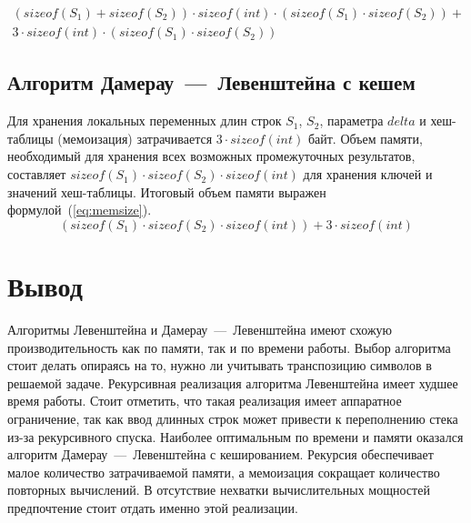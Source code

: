 \begin{equation}
\begin{split}
\label{eq:recL}
    (sizeof(S_1) + sizeof(S_2)) \cdot sizeof(int) \cdot (sizeof(S_1) \cdot sizeof(S_2)) + \\
    3 \cdot sizeof(int) \cdot (sizeof(S_1) \cdot sizeof(S_2))
\end{split}
\end{equation}

\subsection{Алгоритм Дамерау~---~Левенштейна с кешем}

Для хранения локальных переменных длин строк $S_1$, $S_2$, параметра $delta$ и хеш-таблицы (мемоизация) затрачивается $3 \cdot sizeof(int)$ байт. Объем памяти, необходимый для хранения всех возможных промежуточных результатов, составляет $sizeof(S_1) \cdot sizeof(S_2) \cdot sizeof(int)$ для хранения ключей и значений хеш-таблицы. Итоговый объем памяти выражен формулой~(\ref{eq:memsize}).
\begin{equation}
    \label{eq:memsize}
    (sizeof(S_1) \cdot sizeof(S_2) \cdot sizeof(int)) + 3 \cdot sizeof(int)
\end{equation}

\clearpage

\section*{Вывод}

Алгоритмы Левенштейна и Дамерау~---~Левенштейна имеют схожую производительность как по памяти, так и по времени работы. Выбор алгоритма стоит делать опираясь на то, нужно ли учитывать транспозицию символов в решаемой задаче. Рекурсивная реализация алгоритма Левенштейна имеет худшее время работы. Стоит отметить, что такая реализация имеет аппаратное ограничение, так как ввод длинных строк может привести к переполнению стека из-за рекурсивного спуска. Наиболее оптимальным по времени и памяти оказался алгоритм Дамерау~---~Левенштейна с кешированием. Рекурсия обеспечивает малое количество затрачиваемой памяти, а мемоизация сокращает количество повторных вычислений. В отсутствие нехватки вычислительных мощностей предпочтение стоит отдать именно этой реализации.